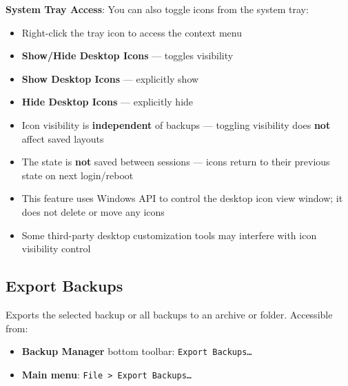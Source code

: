 \documentclass[a4paper,11pt]{article}
\begin{document}
\textbf{System Tray Access}:
You can also toggle icons from the system tray:
\begin{itemize}
  \item Right-click the tray icon to access the context menu
  \item \textbf{Show/Hide Desktop Icons} --- toggles visibility
  \item \textbf{Show Desktop Icons} --- explicitly show
  \item \textbf{Hide Desktop Icons} --- explicitly hide
\end{itemize}

\begin{infobox}
  \begin{itemize}
    \item Icon visibility is \textbf{independent} of backups ---
      toggling visibility does \textbf{not} affect saved layouts
    \item The state is \textbf{not} saved between sessions --- icons
      return to their previous state on next login/reboot
    \item This feature uses Windows API to control the desktop icon
      view window; it does not delete or move any icons
    \item Some third-party desktop customization tools may interfere
      with icon visibility control
  \end{itemize}
\end{infobox}

\subsection{Export Backups}
\label{sec:export-import}

Exports the selected backup or all backups to an archive or folder.
Accessible from:
\begin{itemize}
  \item \textbf{Backup Manager} bottom toolbar: \texttt{Export Backups\ldots}
  \item \textbf{Main menu}: \texttt{File > Export Backups\ldots}
\end{itemize}
\end{document}
